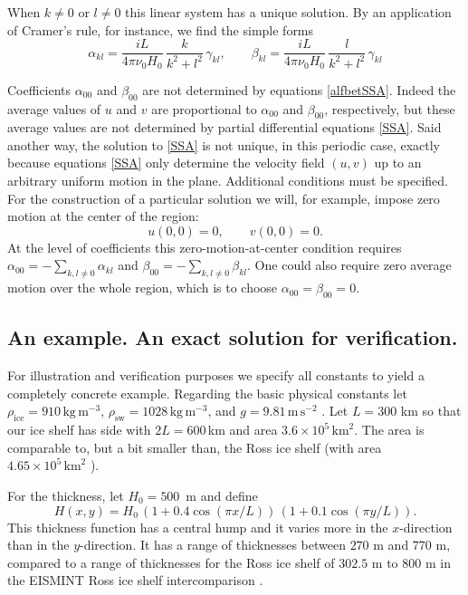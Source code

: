 \documentclass[12pt]{amsart}%
\theoremstyle{plain}
\theoremstyle{definition}
\begin{document}
When $k\ne 0$ or $l\ne 0$ this linear system has a unique solution.  By an application of Cramer's rule, for instance, we find the simple forms
\begin{equation}\label{alfbetSSA}
  \alpha_{kl} = \frac{i L}{4 \pi \nu_0 H_0}\, \frac{k}{k^2+l^2}\, \gamma_{kl}, \qquad  \beta_{kl} = \frac{i L}{4 \pi \nu_0 H_0}\, \frac{l}{k^2+l^2}\, \gamma_{kl} 
\end{equation}

Coefficients $\alpha_{00}$ and $\beta_{00}$ are not determined by equations \eqref{alfbetSSA}.  Indeed the average values of $u$ and $v$ are proportional to $\alpha_{00}$ and $\beta_{00}$, respectively, but these average values are not determined by partial differential equations \eqref{SSA}.  Said another way, the solution to \eqref{SSA} is not unique, in this periodic case, exactly because equations \eqref{SSA} only determine the velocity field $(u,v)$ up to an arbitrary uniform motion in the plane.  Additional conditions must be specified.  For the construction of a particular solution we will, for example, impose zero motion at the center of the region:
\begin{equation}\label{nomotioncenter}
  u(0,0) =0, \qquad v(0,0) = 0.
\end{equation}
At the level of coefficients this zero-motion-at-center condition requires $\alpha_{00} = - \sum_{k,l \ne 0} \alpha_{kl}$ and $\beta_{00} = - \sum_{k,l \ne 0} \beta_{kl}$.  One could also require zero average motion over the whole region, which is to choose $\alpha_{00} = \beta_{00} = 0$.

\subsection{An example. An exact solution for verification.}\label{subsect:ex1}  For illustration and verification purposes we specify all constants to yield a completely concrete example.  Regarding the basic physical constants let $\rho_{\text{ice}} = 910\,\text{kg}\,\text{m}^{-3}$, $\rho_{\text{sw}} = 1028\,\text{kg}\,\text{m}^{-3}$, and $g = 9.81\,\text{m}\,\text{s}^{-2}$ \cite{Paterson}.  Let $L=300$ km so that our ice shelf has side with $2L = 600$\,km and area $3.6 \times 10^5\,\text{km}^2$.  The area is comparable to, but a bit smaller than, the Ross ice shelf (with area $4.65 \times 10^5\,\text{km}^2$ \cite{MacAyealetal}).

For the thickness, let $H_0 = 500$~m and define
\begin{equation}\label{Hexact}
H(x,y) = H_0\, \left(1 + 0.4 \cos(\pi x/L)\right)\, \left(1 + 0.1 \cos(\pi y/L)\right).
\end{equation}
This thickness function has a central hump and it varies more in the $x$-direction than in the $y$-direction.  It has a range of thicknesses between $270$ m and $770$ m, compared to a range of thicknesses for the Ross ice shelf of $302.5$ m to $800$ m in the EISMINT Ross ice shelf intercomparison \cite{MacAyealetal}.
\end{document}
